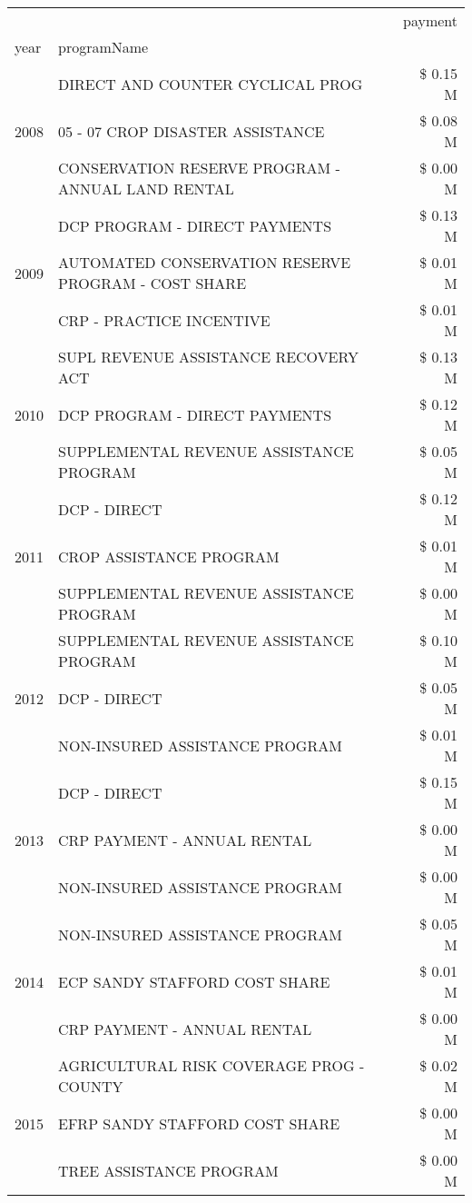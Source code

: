 \begin{tabular}{llr}
\toprule
 &  & payment \\
year & programName &  \\
\midrule
\multirow[t]{3}{*}{2008} & DIRECT AND COUNTER CYCLICAL PROG & \$ 0.15 M \\
 & 05 - 07 CROP DISASTER ASSISTANCE & \$ 0.08 M \\
 & CONSERVATION RESERVE PROGRAM - ANNUAL LAND RENTAL & \$ 0.00 M \\
\cline{1-3}
\multirow[t]{3}{*}{2009} & DCP PROGRAM - DIRECT PAYMENTS & \$ 0.13 M \\
 & AUTOMATED CONSERVATION RESERVE PROGRAM - COST SHARE & \$ 0.01 M \\
 & CRP - PRACTICE INCENTIVE & \$ 0.01 M \\
\cline{1-3}
\multirow[t]{3}{*}{2010} & SUPL REVENUE ASSISTANCE RECOVERY ACT & \$ 0.13 M \\
 & DCP PROGRAM - DIRECT PAYMENTS & \$ 0.12 M \\
 & SUPPLEMENTAL REVENUE ASSISTANCE PROGRAM & \$ 0.05 M \\
\cline{1-3}
\multirow[t]{3}{*}{2011} & DCP - DIRECT & \$ 0.12 M \\
 & CROP ASSISTANCE PROGRAM & \$ 0.01 M \\
 & SUPPLEMENTAL REVENUE ASSISTANCE PROGRAM & \$ 0.00 M \\
\cline{1-3}
\multirow[t]{3}{*}{2012} & SUPPLEMENTAL REVENUE ASSISTANCE PROGRAM & \$ 0.10 M \\
 & DCP - DIRECT & \$ 0.05 M \\
 & NON-INSURED ASSISTANCE PROGRAM & \$ 0.01 M \\
\cline{1-3}
\multirow[t]{3}{*}{2013} & DCP - DIRECT & \$ 0.15 M \\
 & CRP PAYMENT - ANNUAL RENTAL & \$ 0.00 M \\
 & NON-INSURED ASSISTANCE PROGRAM & \$ 0.00 M \\
\cline{1-3}
\multirow[t]{3}{*}{2014} & NON-INSURED ASSISTANCE PROGRAM & \$ 0.05 M \\
 & ECP SANDY STAFFORD COST SHARE & \$ 0.01 M \\
 & CRP PAYMENT - ANNUAL RENTAL & \$ 0.00 M \\
\cline{1-3}
\multirow[t]{3}{*}{2015} & AGRICULTURAL RISK COVERAGE PROG - COUNTY & \$ 0.02 M \\
 & EFRP SANDY STAFFORD COST SHARE & \$ 0.00 M \\
 & TREE ASSISTANCE PROGRAM & \$ 0.00 M \\

\end{tabular}
